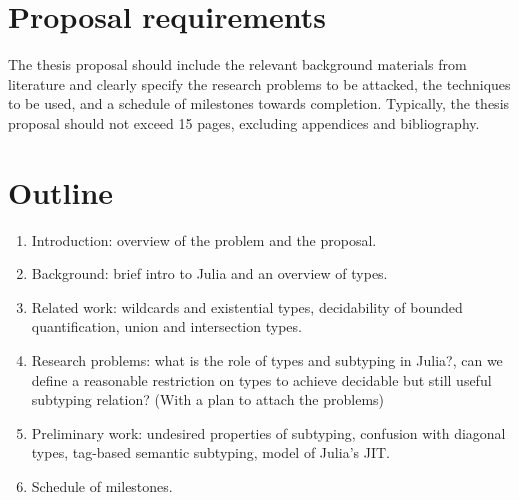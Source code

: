\documentclass[11pt,
  footinclude,headinclude,
  abstract=on
]{scrreprt}
\begin{document}





\section{Proposal requirements}

The thesis proposal should include the relevant background materials from
literature and clearly specify the research problems to be attacked, the
techniques to be used, and a schedule of milestones towards completion.
Typically, the thesis proposal should not exceed 15 pages, excluding appendices
and bibliography.

\section{Outline}

\begin{enumerate}
  \item Introduction: overview of the problem and the proposal.
  \item Background: brief intro to Julia and an overview of types.
  \item Related work: wildcards and existential types, decidability of bounded
    quantification, union and intersection types.
  \item Research problems: what is the role of types and subtyping in Julia?,
    can we define a reasonable restriction on types to achieve decidable but
    still useful subtyping relation? (With a plan to attach the problems)
  \item Preliminary work: undesired properties of subtyping, confusion with
    diagonal types, tag-based semantic subtyping, model of Julia's JIT.
  \item Schedule of milestones.
\end{enumerate}





\end{document}
